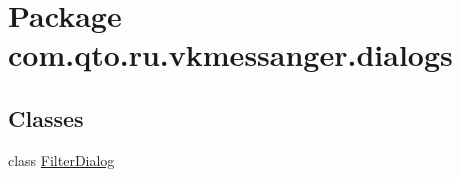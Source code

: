 \hypertarget{namespacecom_1_1qto_1_1ru_1_1vkmessanger_1_1dialogs}{}\section{Package com.\+qto.\+ru.\+vkmessanger.\+dialogs}
\label{namespacecom_1_1qto_1_1ru_1_1vkmessanger_1_1dialogs}
\subsection*{Classes}
\begin{DoxyCompactItemize}
\item 
class \hyperlink{classcom_1_1qto_1_1ru_1_1vkmessanger_1_1dialogs_1_1_filter_dialog}{Filter\+Dialog}
\end{DoxyCompactItemize}
